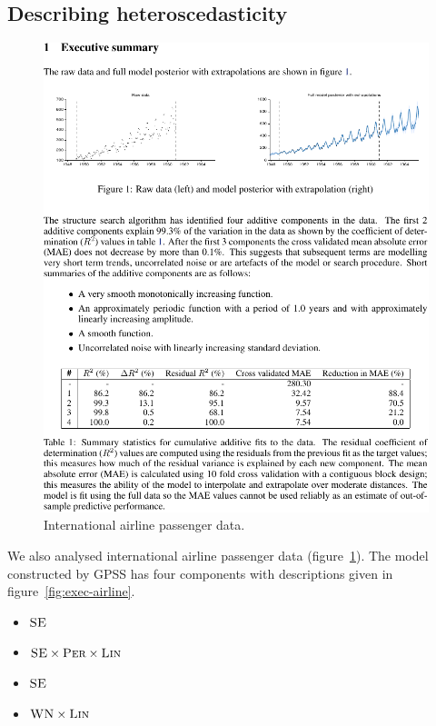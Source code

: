 \documentclass{article}
\begin{document}
\subsection{Describing heteroscedasticity}
\label{sec:airline}

\begin{figure}[h]
\centering
\includegraphics[trim=0cm 12.5cm 9cm 1.7cm, clip, width=0.98\columnwidth]{airlinepages/01-airline-separate-pages-2}
\caption{
International airline passenger data.}
\label{fig:airline}
\end{figure}

We also analysed international airline passenger data (figure~\ref{fig:airline}).
The model constructed by GPSS has four components with descriptions given in figure~\ref{fig:exec-airline}.
\vspace{-0.5\baselineskip}
\begin{itemize}
  \itemsep0em
  \item ${\textsc{SE}}$
  \item ${\textsc{SE}} \times {\textsc{Per}} \times {\textsc{Lin}}$
  \item ${\textsc{SE}}$
  \item ${\textsc{WN}} \times {\textsc{Lin}}$
\end{itemize}
\vspace{-\baselineskip}
\end{document}
